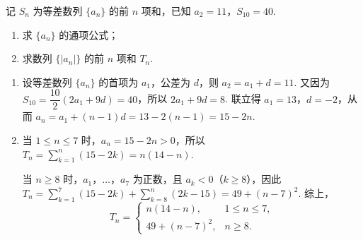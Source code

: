 \begin{problem}
记 \(S_n\) 为等差数列 \(\{a_n\}\) 的前 \(n\) 项和，已知 \(a_2=11\)，\(S_{10}=40\).
\begin{enumerate}
\item 求 \(\{a_n\}\) 的通项公式；
\item 求数列 \(\{|a_n|\}\) 的前 \(n\) 项和 \(T_n\).
\end{enumerate}

\begin{solution}
\begin{enumerate}
\item 设等差数列 \(\{a_n\}\) 的首项为 \(a_1\)，公差为 \(d\)，则 \(a_2=a_1+d=11\). 又因为
\(S_{10}=\dfrac{10}{2}(2a_1+9d)=40\)，所以 \(2a_1+9d=8\). 联立得 \(a_1=13\)，\(d=-2\)，从而
\(a_n=a_1+(n-1)d=13-2(n-1)=15-2n\).
\item 当 \(1\le n\le7\) 时，\(a_n=15-2n>0\)，所以
\(T_n=\sum_{k=1}^n(15-2k)=n(14-n)\).

当 \(n\ge8\) 时，\(a_1\)，\(\ldots\)，\(a_7\) 为正数，且 \(a_k<0\)（\(k\ge8\)），因此
\(T_n=\sum_{k=1}^7(15-2k)+\sum_{k=8}^n(2k-15)=49+(n-7)^2\).
综上，
\[
T_n=\begin{cases}
n(14-n),&1\le n\le7,\\
49+(n-7)^2,&n\ge8.
\end{cases}
\]
\end{enumerate}
\end{solution}
\end{problem}

